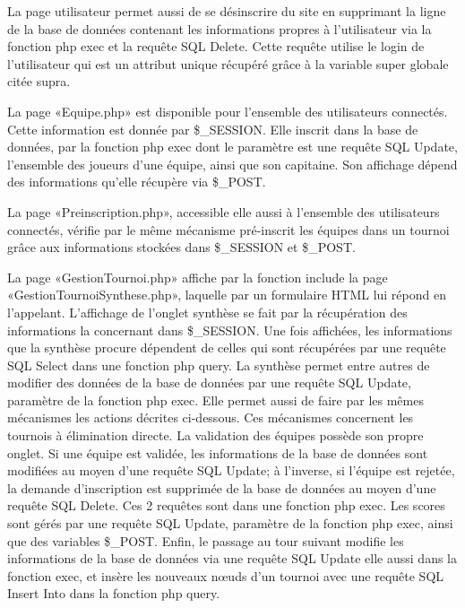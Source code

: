 \documentclass[12pt]{report}
\begin{document}
       La page utilisateur permet aussi de se désinscrire du site en supprimant la ligne de la base de données contenant les informations propres à l’utilisateur via la fonction php exec et la requête SQL Delete. Cette requête utilise le login de l’utilisateur qui est un attribut unique récupéré grâce à la variable super globale citée supra.  \bigskip
       \par
	   La page «Equipe.php» est disponible pour l’ensemble des utilisateurs connectés. Cette information est donnée par \$\_SESSION. Elle inscrit dans la base de données, par la fonction php exec dont le paramètre est une requête SQL Update, l’ensemble des joueurs d’une équipe, ainsi que son capitaine. Son affichage dépend des informations qu’elle récupère via \$\_POST.
	   \bigskip
       \par
	   La page «Preinscription.php», accessible elle aussi à l’ensemble des utilisateurs connectés, vérifie par le même mécanisme pré-inscrit les équipes dans un tournoi grâce aux informations stockées dans \$\_SESSION et \$\_POST.
       \bigskip
       \par
   	   La page «GestionTournoi.php» affiche par la fonction include la page 
   	   «GestionTournoiSynthese.php», laquelle par un formulaire HTML lui 
   	   répond en l’appelant.
       L’affichage de l’onglet synthèse se fait par la récupération des informations la concernant dans \$\_SESSION. Une fois affichées, les informations que la synthèse procure dépendent de celles qui sont récupérées par une requête SQL Select dans une fonction php query. La synthèse permet entre autres de modifier des données de la base de données par une requête SQL Update, paramètre de la fonction php exec. Elle permet aussi de faire par les mêmes mécanismes les actions décrites ci-dessous. Ces mécanismes concernent les tournois à élimination directe.
       La validation des équipes possède son propre onglet. Si une équipe est validée, les informations de la base de données sont modifiées au moyen d’une requête SQL Update; à l’inverse, si l’équipe est rejetée, la demande d’inscription est supprimée de la base de données au moyen d’une requête SQL Delete. Ces 2 requêtes sont dans une fonction php exec.
       Les scores sont gérés par une requête SQL Update, paramètre de la fonction php exec, ainsi que des variables \$\_POST.
       Enfin, le passage au tour suivant modifie les informations de la base de données via une requête SQL Update elle aussi dans la fonction exec, et insère les nouveaux nœuds d’un tournoi avec une requête SQL Insert Into dans la fonction php query.
\end{document}
